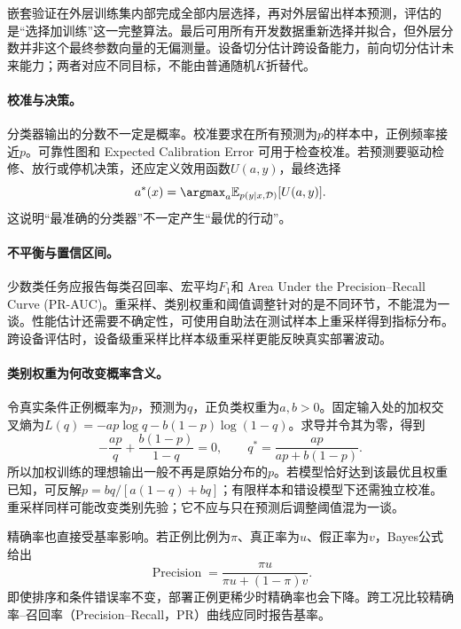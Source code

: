 嵌套验证在外层训练集内部完成全部内层选择，再对外层留出样本预测，评估的是“选择加训练”这一完整算法。最后可用所有开发数据重新选择并拟合，但外层分数并非这个最终参数向量的无偏测量。设备切分估计跨设备能力，前向切分估计未来能力；两者对应不同目标，不能由普通随机$K$折替代。

\paragraph{校准与决策。}
分类器输出的分数不一定是概率。校准要求在所有预测为$p$的样本中，正例频率接近$p$。可靠性图和 Expected Calibration Error 可用于检查校准。若预测要驱动检修、放行或停机决策，还应定义效用函数$U(a,y)$，最终选择
\begin{equation}
 a^*(x)=\argmax_a\mathbb{E}_{p(y\mid x,\mathcal{D})}[U(a,y)].
\end{equation}
这说明“最准确的分类器”不一定产生“最优的行动”。

\paragraph{不平衡与置信区间。}
少数类任务应报告每类召回率、宏平均$F_1$和 Area Under the Precision--Recall Curve (PR-AUC)。重采样、类别权重和阈值调整针对的是不同环节，不能混为一谈。性能估计还需要不确定性，可使用自助法在测试样本上重采样得到指标分布。跨设备评估时，设备级重采样比样本级重采样更能反映真实部署波动。

\paragraph{类别权重为何改变概率含义。}
令真实条件正例概率为$p$，预测为$q$，正负类权重为$a,b>0$。固定输入处的加权交叉熵为$L(q)=-ap\log q-b(1-p)\log(1-q)$。求导并令其为零，得到
\begin{equation}
 -\frac{ap}{q}+\frac{b(1-p)}{1-q}=0,
 \qquad q^*=\frac{ap}{ap+b(1-p)}.
\end{equation}
所以加权训练的理想输出一般不再是原始分布的$p$。若模型恰好达到该最优且权重已知，可反解$p=bq/[a(1-q)+bq]$；有限样本和错设模型下还需独立校准。重采样同样可能改变类别先验；它不应与只在预测后调整阈值混为一谈。

精确率也直接受基率影响。若正例比例为$\pi$、真正率为$u$、假正率为$v$，Bayes公式给出
\begin{equation}
 \operatorname{Precision}=\frac{\pi u}{\pi u+(1-\pi)v}.
\end{equation}
即使排序和条件错误率不变，部署正例更稀少时精确率也会下降。跨工况比较精确率--召回率（Precision--Recall，PR）曲线应同时报告基率。

